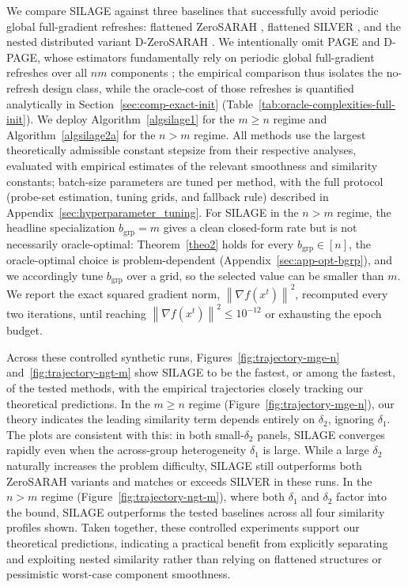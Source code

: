 \documentclass{article}
\newcommand{\sqn}[1]{\left\| #1 \right\|^2}
\theoremstyle{plain}
\newcommand{\algname}[1]{{\sf\scalefont{0.88}\color{mydarkgreen}#1}\xspace}
\def\algname#1{#1}%
\begin{document}
We compare \algname{SILAGE} against three baselines that successfully avoid periodic global full-gradient refreshes: flattened \algname{ZeroSARAH} \citep{li2021zerosarah}, flattened \algname{SILVER} \citep{oko24}, and the nested distributed variant \algname{D-ZeroSARAH} \citep{li2021zerosarah}. We intentionally omit \algname{PAGE} and \algname{D-PAGE}, whose estimators fundamentally rely on periodic global full-gradient refreshes over all $nm$ components \citep{li21,PAGE-AB}; the empirical comparison thus isolates the no-refresh design class, while the oracle-cost of those refreshes is quantified analytically in Section~\ref{sec:comp-exact-init} (Table~\ref{tab:oracle-complexities-full-init}). We deploy Algorithm~\ref{algsilage1} for the $m\ge n$ regime and Algorithm~\ref{algsilage2a} for the $n>m$ regime. All methods use the largest theoretically admissible constant stepsize from their respective analyses, evaluated with empirical estimates of the relevant smoothness and similarity constants; batch-size parameters are tuned per method, with the full protocol (probe-set estimation, tuning grids, and fallback rule) described in Appendix~\ref{sec:hyperparameter_tuning}. For \algname{SILAGE} in the $n>m$ regime, the headline specialization $b_{\mathrm{grp}}=m$ gives a clean closed-form rate but is not necessarily oracle-optimal: Theorem~\ref{theo2} holds for every $b_{\mathrm{grp}}\in[n]$, the oracle-optimal choice is problem-dependent (Appendix~\ref{sec:app-opt-bgrp}), and we accordingly tune $b_{\mathrm{grp}}$ over a grid, so the selected value can be smaller than $m$. We report the exact squared gradient norm, $\sqn{\nabla f(x^t)}$, recomputed every two iterations, until reaching $\sqn{\nabla f(x^t)} \le 10^{-12}$ or exhausting the epoch budget.

Across these controlled synthetic runs, Figures~\ref{fig:trajectory-mge-n} and~\ref{fig:trajectory-ngt-m} show \algname{SILAGE} to be the fastest, or among the fastest, of the tested methods, with the empirical trajectories closely tracking our theoretical predictions. In the $m \ge n$ regime (Figure~\ref{fig:trajectory-mge-n}), our theory indicates the leading similarity term depends entirely on $\delta_2$, ignoring $\delta_1$. The plots are consistent with this: in both small-$\delta_2$ panels, \algname{SILAGE} converges rapidly even when the across-group heterogeneity $\delta_1$ is large. While a large $\delta_2$ naturally increases the problem difficulty, \algname{SILAGE} still outperforms both \algname{ZeroSARAH} variants and matches or exceeds \algname{SILVER} in these runs. In the $n > m$ regime (Figure~\ref{fig:trajectory-ngt-m}), where both $\delta_1$ and $\delta_2$ factor into the bound, \algname{SILAGE} outperforms the tested baselines across all four similarity profiles shown. Taken together, these controlled experiments support our theoretical predictions, indicating a practical benefit from explicitly separating and exploiting nested similarity rather than relying on flattened structures or pessimistic worst-case component smoothness.
\end{document}

